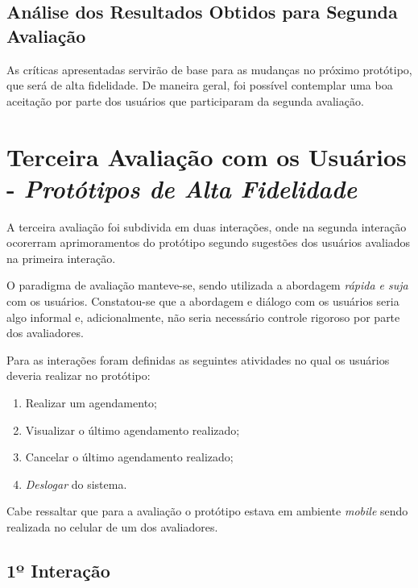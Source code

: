 		\subsection[Análise dos Resultados Obtidos para Segunda Avaliação]{Análise dos Resultados Obtidos para Segunda Avaliação}
		\label{sec:segundaAvaliacao_Analise}

			As críticas apresentadas servirão de base para as mudanças no próximo protótipo, que será de alta fidelidade. De maneira geral, foi possível contemplar uma boa aceitação por parte dos usuários que participaram da segunda avaliação.

	\newpage
	\section[Terceira Avaliação com os Usuários - Protótipos de Alta Fidelidade]{Terceira Avaliação com os Usuários - \emph{Protótipos de Alta Fidelidade}}
	\label{sec:avaliacaoPrototipos_Terceira}

		A terceira avaliação foi subdivida em duas interações, onde na segunda interação ocorerram aprimoramentos do protótipo segundo sugestões dos usuários avaliados na primeira interação.

		O paradigma de avaliação manteve-se, sendo utilizada a abordagem \emph{rápida e suja} com os usuários. Constatou-se que a abordagem e diálogo com os usuários seria algo informal e, adicionalmente, não seria necessário controle rigoroso por parte dos avaliadores.

		Para as interações foram definidas as seguintes atividades no qual os usuários deveria realizar no protótipo:

		\begin{enumerate}
			\item{Realizar um agendamento;}
			\item{Visualizar o último agendamento realizado;}
			\item{Cancelar o último agendamento realizado;}
			\item{\emph{Deslogar} do sistema.}
		\end{enumerate}

		Cabe ressaltar que para a avaliação o protótipo estava em ambiente \emph{mobile} sendo realizada no celular de um dos avaliadores.

		\subsection[1º Interação]{1º Interação}
		\label{sec:terceiraAvaliacao_1}

